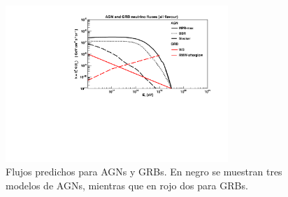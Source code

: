 	
	\begin{figure}[ht]
		\begin{center}
		\includegraphics[width=0.75\textwidth]{fig/introduccion/AGN_GRB_nufluxes}
		\caption{\label{fig:flujosAGN} Flujos predichos para AGNs y GRBs. En negro se muestran tres modelos de AGNs\cite{cite:Mannheim1,cite:BBR,cite:SteckerAGN}, mientras que en rojo dos para GRBs\cite{cite:grb_Waxman2,cite:grb_Supernova}.}
		\end{center}
	\end{figure}
	
% 	



